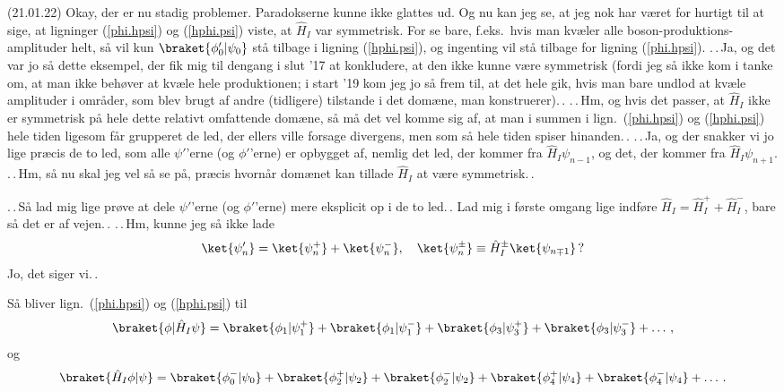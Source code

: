 \documentclass{report}
\begin{document}
(21.01.22) Okay, der er nu stadig problemer. Paradokserne kunne ikke glattes ud. Og nu kan jeg se, at jeg nok har været for hurtigt til at sige, at ligninger (\ref{phi.hpsi}) og (\ref{hphi.psi}) viste, at $\hat H_I$ var symmetrisk. For se bare, f.eks.\ hvis man kvæler alle boson-produktions-amplituder helt, så vil kun $\braket{\phi_0'|\psi_0}$ stå tilbage i ligning (\ref{hphi.psi}), og ingenting vil stå tilbage for ligning (\ref{phi.hpsi}). .\,.\,Ja, og det var jo så dette eksempel, der fik mig til dengang i slut '17 at konkludere, at den ikke kunne være symmetrisk (fordi jeg så ikke kom i tanke om, at man ikke behøver at kvæle hele produktionen; i start '19 kom jeg jo så frem til, at det hele gik, hvis man bare undlod at kvæle amplituder i områder, som blev brugt af andre (tidligere) tilstande i det domæne, man konstruerer).\,. .\,.\,Hm, og hvis det passer, at $\hat H_I$ ikke er symmetrisk på hele dette relativt omfattende domæne, så må det vel komme sig af, at man i summen i lign.\ (\ref{phi.hpsi}) og (\ref{hphi.psi}) hele tiden ligesom får grupperet de led, der ellers ville forsage divergens, men som så hele tiden spiser hinanden.\,. .\,.\,Ja, og der snakker vi jo lige præcis de to led, som alle $\psi'$'erne (og $\phi'$'erne) er opbygget af, nemlig det led, der kommer fra $\hat H_I \psi_{n-1}$, og det, der kommer fra $\hat H_I \psi_{n+1}$. .\,.\,Hm, så nu skal jeg vel så se på, præcis hvornår domænet kan tillade $\hat H_I$ at være symmetrisk.\,. 

.\,.\,Så lad mig lige prøve at dele $\psi'$'erne (og $\phi'$'erne) mere eksplicit op i de to led.\,. Lad mig i første omgang lige indføre $\hat H_I = \hat H_I^+ + \hat H_I^-$, bare så det er af vejen.\,. .\,.\,Hm, kunne jeg så ikke lade
\begin{align}
\begin{aligned}
	\ket{\psi_n'} = \ket{\psi_n^+} + \ket{\psi_n^-}, \quad 
		\ket{\psi_n^\pm} \equiv \hat H_I^\pm \ket{\psi_{n\mp 1}}\,?
\end{aligned}
\end{align}
Jo, det siger vi.\,. 

Så bliver lign.\ (\ref{phi.hpsi}) og (\ref{hphi.psi}) til
\begin{align}
\begin{aligned}
	\braket{\phi| \hat H_I \psi} = \braket{\phi_1| \psi_1^+} + \braket{\phi_1| \psi_1^-} + \braket{\phi_3| \psi_3^+} + \braket{\phi_3| \psi_3^-} + \ldots\,, 
	\label{pm-dotp1}
\end{aligned}
\end{align}
og
\begin{align}
\begin{aligned}
	\braket{\hat H_I \phi| \psi} = \braket{\phi_0^-| \psi_0}  + \braket{\phi_2^+| \psi_2} + \braket{\phi_2^-| \psi_2} + \braket{\phi_4^+| \psi_4} + \braket{\phi_4^-| \psi_4} + \ldots\,.
\label{pm-dotp2}
\end{aligned}
\end{align}
\end{document}
